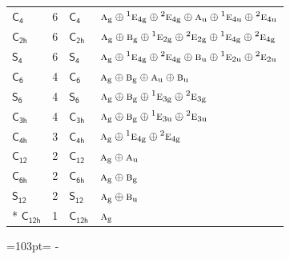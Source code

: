 \documentclass[10pt,a4paper]{article}
\newcommand{\needspace}[1]{\par\penalty-100\begingroup\dimen0=#1\relax\dimen2=\pagegoal
  \advance\dimen2-\pagetotal\ifdim\dimen0>\dimen2\relax\ifdim\dimen2>0pt\vfil\break\fi\fi
  \endgroup}
\numberwithin{equation}{section}
\newcommand{\grp}[1]{\mathsf{#1}}
\newcommand{\irr}[1]{\text{\normalfont\scshape #1}}
\newcommand{\conjpair}[1]{{}^{#1}}
\newcommand{\ptag}[1]{\mathrm{#1}}
\newlength{\fillwidth}\newlength{\cellwidth}\newlength{\colwidth}
\begin{document}
{\begin{longtable}{@{}lrl>{\RaggedRight\arraybackslash}p{\fillwidth}@{}}
\href{C4.pdf}{$\grp{C_{4}}$} & 6 & \href{C4.pdf}{$\grp{C_{4}}$} & $\irr{a}_{\ptag{g}}\oplus \conjpair{1}\irr{e}_{4\ptag{g}}\oplus \conjpair{2}\irr{e}_{4\ptag{g}}\oplus \irr{a}_{\ptag{u}}\oplus \conjpair{1}\irr{e}_{4\ptag{u}}\oplus \conjpair{2}\irr{e}_{4\ptag{u}}$\\
\href{C2h.pdf}{$\grp{C_{2h}}$} & 6 & \href{C2h.pdf}{$\grp{C_{2h}}$} & $\irr{a}_{\ptag{g}}\oplus \irr{b}_{\ptag{g}}\oplus \conjpair{1}\irr{e}_{2\ptag{g}}\oplus \conjpair{2}\irr{e}_{2\ptag{g}}\oplus \conjpair{1}\irr{e}_{4\ptag{g}}\oplus \conjpair{2}\irr{e}_{4\ptag{g}}$\\
\href{S4.pdf}{$\grp{S_{4}}$} & 6 & \href{S4.pdf}{$\grp{S_{4}}$} & $\irr{a}_{\ptag{g}}\oplus \conjpair{1}\irr{e}_{4\ptag{g}}\oplus \conjpair{2}\irr{e}_{4\ptag{g}}\oplus \irr{b}_{\ptag{u}}\oplus \conjpair{1}\irr{e}_{2\ptag{u}}\oplus \conjpair{2}\irr{e}_{2\ptag{u}}$\\
\href{C6.pdf}{$\grp{C_{6}}$} & 4 & \href{C6.pdf}{$\grp{C_{6}}$} & $\irr{a}_{\ptag{g}}\oplus \irr{b}_{\ptag{g}}\oplus \irr{a}_{\ptag{u}}\oplus \irr{b}_{\ptag{u}}$\\
\href{S6.pdf}{$\grp{S_{6}}$} & 4 & \href{S6.pdf}{$\grp{S_{6}}$} & $\irr{a}_{\ptag{g}}\oplus \irr{b}_{\ptag{g}}\oplus \conjpair{1}\irr{e}_{3\ptag{g}}\oplus \conjpair{2}\irr{e}_{3\ptag{g}}$\\
\href{C3h.pdf}{$\grp{C_{3h}}$} & 4 & \href{C3h.pdf}{$\grp{C_{3h}}$} & $\irr{a}_{\ptag{g}}\oplus \irr{b}_{\ptag{g}}\oplus \conjpair{1}\irr{e}_{3\ptag{u}}\oplus \conjpair{2}\irr{e}_{3\ptag{u}}$\\
\href{C4h.pdf}{$\grp{C_{4h}}$} & 3 & \href{C4h.pdf}{$\grp{C_{4h}}$} & $\irr{a}_{\ptag{g}}\oplus \conjpair{1}\irr{e}_{4\ptag{g}}\oplus \conjpair{2}\irr{e}_{4\ptag{g}}$\\
\href{C12.pdf}{$\grp{C_{12}}$} & 2 & \href{C12.pdf}{$\grp{C_{12}}$} & $\irr{a}_{\ptag{g}}\oplus \irr{a}_{\ptag{u}}$\\
\href{C6h.pdf}{$\grp{C_{6h}}$} & 2 & \href{C6h.pdf}{$\grp{C_{6h}}$} & $\irr{a}_{\ptag{g}}\oplus \irr{b}_{\ptag{g}}$\\
\href{S12.pdf}{$\grp{S_{12}}$} & 2 & \href{S12.pdf}{$\grp{S_{12}}$} & $\irr{a}_{\ptag{g}}\oplus \irr{b}_{\ptag{u}}$\\*
\href{C12h.pdf}{$\grp{C_{12h}}$} & 1 & \href{C12h.pdf}{$\grp{C_{12h}}$} & $\irr{a}_{\ptag{g}}$\\
\bottomrule\end{longtable}}
\needspace{103pt}
\end{document}
